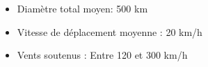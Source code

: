 \documentclass[aspectratio=169, usepdftitle=false, xcolor={dvipsnames}, 9pt]{beamer}
\begin{document}
\begin{frame}[t]
\begin{columns}
\begin{column}{0.5\textwidth}
\begin{block}
\begin{itemize}
                    \item Diamètre total moyen\footnotemark : 500 km \parencite{carrasco_influence_2014}
                    \item Vitesse de déplacement moyenne : 20 km/h
                    \item Vents soutenus : Entre 120 et 300 km/h
                \end{itemize}
            \end{block}
        \end{column}
    \end{columns}
    \renewcommand*{\thefootnote}{\arabic{footnote}}
    \setcounter{footnote}{0}
\end{frame}

\end{document}

